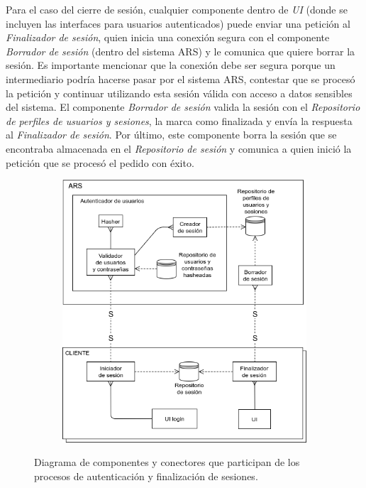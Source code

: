 \par Para el caso del cierre de sesión, cualquier componente dentro de \textit{UI} (donde se incluyen las interfaces para usuarios autenticados) puede enviar una petición al \textit{Finalizador de sesión}, quien inicia una conexión segura con el componente \textit{Borrador de sesión} (dentro del sistema ARS) y le comunica que quiere borrar la sesión. Es importante mencionar que la conexión debe ser segura porque un intermediario podría hacerse pasar por el sistema ARS, contestar que se procesó la petición y continuar utilizando esta sesión válida con acceso a datos sensibles del sistema. El componente \textit{Borrador de sesión} valida la sesión con el \textit{Repositorio de perfiles de usuarios y sesiones}, la marca como finalizada y envía la respuesta al \textit{Finalizador de sesión}. Por último, este componente borra la sesión que se encontraba almacenada en el \textit{Repositorio de sesión} y comunica a quien inició la petición que se procesó el pedido con éxito.

\begin{figure}[H]
  \begin{subfigure}{\textwidth}
    \includegraphics[width=\textwidth]{imagenes/diagramas/loginYLogout.png}
  \end{subfigure}
  \caption{Diagrama de componentes y conectores que participan de los procesos de autenticación y finalización de sesiones.}
  \label{fig:dia_cyc_autenticacion}
\end{figure}



